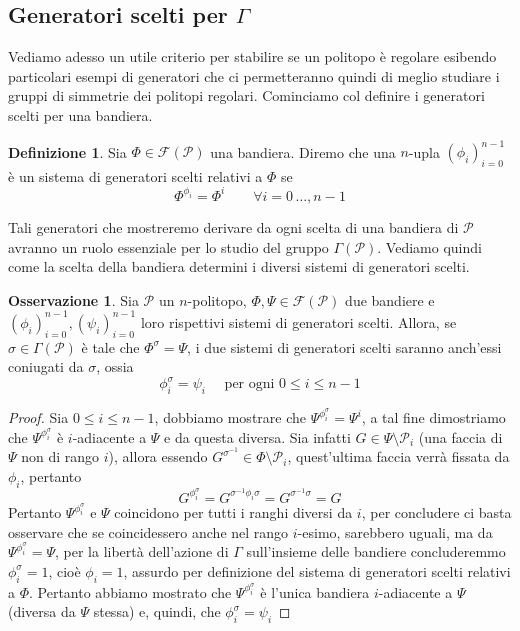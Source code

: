 \documentclass[a4paper,12pt]{report}
\newcommand{\p}{\mathcal{P}}
\theoremstyle{plain}
\theoremstyle{definition}
\newtheorem{defin}[teo]{Definizione}
\newtheorem{oss}[teo]{Osservazione}
\newcommand\flag[1]{\mathcal{F}(#1)}
\begin{document}
\subsection{Generatori scelti per $\Gamma$}
Vediamo adesso un utile criterio per stabilire se un politopo \`e regolare esibendo particolari esempi di generatori che ci permetteranno quindi
di meglio studiare i gruppi di simmetrie dei politopi regolari. Cominciamo col definire i generatori scelti per una bandiera.
\begin{defin}
Sia $\Phi\in\flag{\p}$ una bandiera. Diremo che una $n$-upla $(\phi_i)_{i=0}^{n-1}$ \`e un sistema di generatori scelti relativi a $\Phi$ se
\begin{equation*}
\Phi^{\phi_i}=\Phi^i\qquad\forall i=0\,\dots,n-1
\end{equation*}
\end{defin}

Tali generatori che mostreremo derivare da ogni scelta di una bandiera di $\p$ avranno un ruolo essenziale per lo studio del gruppo $\Gamma(\p)$.
Vediamo quindi come la scelta della bandiera determini i diversi sistemi di generatori scelti.
\begin{oss}
\label{oss:GeneratingInvolutions}
Sia $\p$ un $n$-politopo, $\Phi,\Psi\in\flag{\p}$ due bandiere e $(\phi_i)_{i=0}^{n-1}, (\psi_i)_{i=0}^{n-1}$ loro rispettivi sistemi di
generatori scelti. Allora, se $\sigma\in\Gamma(\p)$ \`e tale che $\Phi^\sigma=\Psi$, i due sistemi di generatori scelti saranno anch'essi coniugati
da $\sigma$, ossia
\begin{equation*}
\phi_i^\sigma=\psi_i\quad\text{ per ogni }0\leq i\leq n-1
\end{equation*}
\end{oss}
\begin{proof}
Sia $0\leq i\leq n-1$, dobbiamo mostrare che $\Psi^{\phi_i^\sigma}=\Psi^i$, a tal fine dimostriamo che $\Psi^{\phi_i^\sigma}$ \`e
$i$-adiacente a $\Psi$ e da questa diversa. Sia infatti $G\in\Psi\setminus\p_i$ (una faccia di $\Psi$ non di rango $i$), allora
essendo $G^{\sigma^{-1}}\in\Phi\setminus\p_i$, quest'ultima faccia verr\`a fissata da $\phi_i$, pertanto
\begin{equation*}
G^{\phi_i^{\sigma}}=G^{\sigma^{-1}\phi_i\sigma}=G^{\sigma^{-1}\sigma}=G
\end{equation*}
Pertanto $\Psi^{\phi_i^\sigma}$ e $\Psi$ coincidono per tutti i ranghi diversi da $i$, per concludere ci basta osservare che se
coincidessero anche nel rango $i$-esimo, sarebbero uguali, ma da $\Psi^{\phi_i^\sigma}=\Psi$, per la libert\`a dell'azione di
$\Gamma$ sull'insieme delle bandiere concluderemmo $\phi_i^\sigma=1$, cio\`e $\phi_i=1$, assurdo per definizione del sistema di
generatori scelti relativi a $\Phi$. Pertanto abbiamo mostrato che $\Psi^{\phi_i^\sigma}$ \`e l'unica bandiera $i$-adiacente a $\Psi$
(diversa da $\Psi$ stessa) e, quindi, che $\phi_i^\sigma=\psi_i$
\end{proof}
\end{document}
